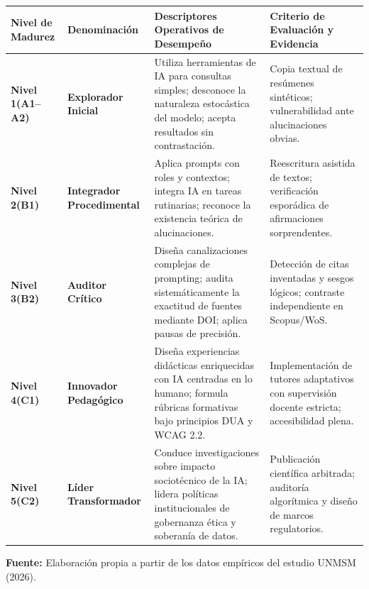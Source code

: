 \begin{table}[htpb!]
\centering
\small
\begin{tabularx}{\textwidth}{p{2.5cm} p{3.2cm} p{4.5cm} X}
\toprule
\textbf{Nivel de Madurez} & \textbf{Denominación} & \textbf{Descriptores Operativos de Desempeño} & \textbf{Criterio de Evaluación y Evidencia} \\
\midrule
\textbf{Nivel 1\newline(A1--A2)} & \textbf{Explorador Inicial} & Utiliza herramientas de IA para consultas simples; desconoce la naturaleza estocástica del modelo; acepta resultados sin contrastación. & Copia textual de resúmenes sintéticos; vulnerabilidad ante alucinaciones obvias. \\
\midrule
\textbf{Nivel 2\newline(B1)} & \textbf{Integrador Procedimental} & Aplica prompts con roles y contextos; integra IA en tareas rutinarias; reconoce la existencia teórica de alucinaciones. & Reescritura asistida de textos; verificación esporádica de afirmaciones sorprendentes. \\
\midrule
\textbf{Nivel 3\newline(B2)} & \textbf{Auditor Crítico} & Diseña canalizaciones complejas de prompting; audita sistemáticamente la exactitud de fuentes mediante DOI; aplica pausas de precisión. & Detección de citas inventadas y sesgos lógicos; contraste independiente en Scopus/WoS. \\
\midrule
\textbf{Nivel 4\newline(C1)} & \textbf{Innovador Pedagógico} & Diseña experiencias didácticas enriquecidas con IA centradas en lo humano; formula rúbricas formativas bajo principios DUA y WCAG 2.2. & Implementación de tutores adaptativos con supervisión docente estricta; accesibilidad plena. \\
\midrule
\textbf{Nivel 5\newline(C2)} & \textbf{Líder Transformador} & Conduce investigaciones sobre impacto sociotécnico de la IA; lidera políticas institucionales de gobernanza ética y soberanía de datos. & Publicación científica arbitrada; auditoría algorítmica y diseño de marcos regulatorios. \\
\bottomrule
\end{tabularx}
\vspace{0.2cm}
\begin{flushleft}
\scriptsize \textbf{Fuente:} Elaboración propia a partir de los datos empíricos del estudio UNMSM (2026).
\end{flushleft}
\end{table}

